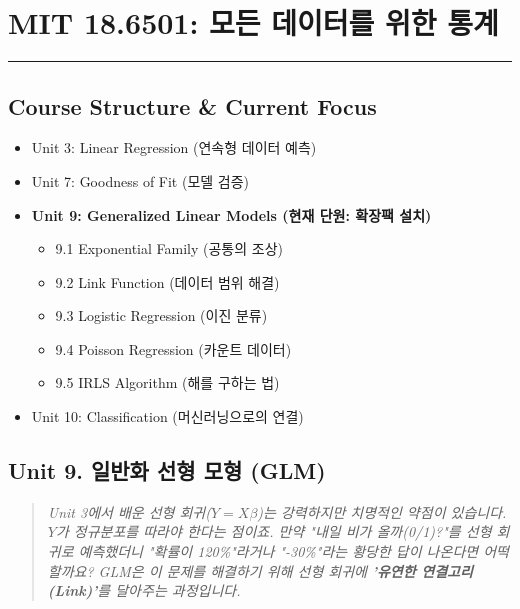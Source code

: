 \documentclass[11pt,a4paper]{book}
\theoremstyle{definition}
\begin{document}
\chapter{MIT 18.6501: 모든 데이터를 위한 통계}
\label{ch:lecture9}


\vspace{1cm}
\hrule
\vspace{1cm}

\section*{Course Structure \& Current Focus}
\begin{itemize}
    \item Unit 3: Linear Regression (연속형 데이터 예측)
    \item Unit 7: Goodness of Fit (모델 검증)
    \item \textbf{\textcolor{mainblue}{Unit 9: Generalized Linear Models (현재 단원: 확장팩 설치)}}
    \begin{itemize}
        \item 9.1 Exponential Family (공통의 조상)
        \item 9.2 Link Function (데이터 범위 해결)
        \item 9.3 Logistic Regression (이진 분류)
        \item 9.4 Poisson Regression (카운트 데이터)
        \item 9.5 IRLS Algorithm (해를 구하는 법)
    \end{itemize}
    \item Unit 10: Classification (머신러닝으로의 연결)
\end{itemize}


\section{Unit 9. 일반화 선형 모형 (GLM)}

\begin{quote}
\textit{Unit 3에서 배운 선형 회귀($Y=X\beta$)는 강력하지만 치명적인 약점이 있습니다. $Y$가 정규분포를 따라야 한다는 점이죠. 만약 "내일 비가 올까(0/1)?"를 선형 회귀로 예측했더니 "확률이 120\%"라거나 "-30\%"라는 황당한 답이 나온다면 어떡할까요? GLM은 이 문제를 해결하기 위해 선형 회귀에 \textbf{'유연한 연결고리(Link)'}를 달아주는 과정입니다.}
\end{quote}
\end{document}
